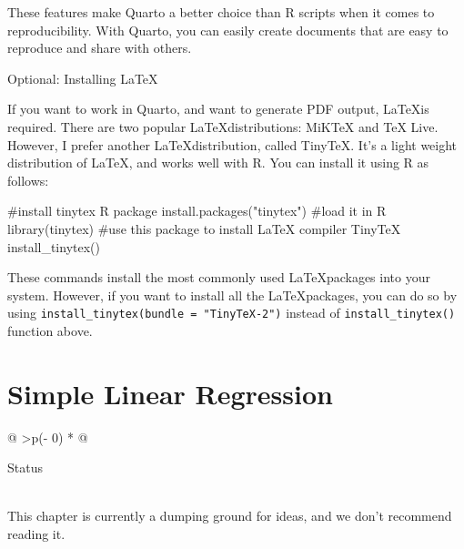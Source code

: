 \documentclass[
  letterpaper,
  twoside,
  openright,
  headsepline,
  footsepline,
  listof = totocnumbered,
  chapterprefix = true,
  titlepage = false]{scrbook}
\newenvironment{Shaded}{\begin{snugshade}}{\end{snugshade}}
\newcommand{\CommentTok}[1]{\textcolor[rgb]{0.37,0.37,0.37}{#1}}
\newcommand{\FunctionTok}[1]{\textcolor[rgb]{0.28,0.35,0.67}{#1}}
\newcommand{\NormalTok}[1]{\textcolor[rgb]{0.00,0.23,0.31}{#1}}
\newcommand{\StringTok}[1]{\textcolor[rgb]{0.13,0.47,0.30}{#1}}
\begin{document}
These features make Quarto a better choice than R scripts when it comes
to reproducibility. With Quarto, you can easily create documents that
are easy to reproduce and share with others.

Optional: Installing \LaTeX

If you want to work in Quarto, and want to generate PDF output,
\LaTeX is required. There are two popular \LaTeX distributions: MiKTeX
and TeX Live. However, I prefer another \LaTeX distribution, called
TinyTeX. It's a light weight distribution of \LaTeX, and works well with
R. You can install it using R as follows:

\begin{Shaded}
\begin{Highlighting}[numbers=left,,]
\CommentTok{\#install tinytex R package}
\FunctionTok{install.packages}\NormalTok{(}\StringTok{"tinytex"}\NormalTok{)}
\CommentTok{\#load it in R}
\FunctionTok{library}\NormalTok{(tinytex)}
\CommentTok{\#use this package to install LaTeX compiler TinyTeX}
\FunctionTok{install\_tinytex}\NormalTok{()}
\end{Highlighting}
\end{Shaded}

These commands install the most commonly used \LaTeX packages into your
system. However, if you want to install all the \LaTeX packages, you can
do so by using \texttt{install\_tinytex(bundle\ =\ "TinyTeX-2")} instead
of \texttt{install\_tinytex()} function above.


\hypertarget{simple-linear-regression}{%
\chapter{Simple Linear Regression}\label{simple-linear-regression}}

\begin{longtable}[]{@{}
  >{\centering\arraybackslash}p{(\columnwidth - 0\tabcolsep) * }@{}}
\toprule\noalign{}
\begin{minipage}[b]{\linewidth}\centering
Status
\end{minipage} \\
\midrule\noalign{}
\endhead
\bottomrule\noalign{}
\endlastfoot
This chapter is currently a dumping ground for ideas, and we don't
recommend reading it. \\
\end{longtable}
\end{document}
